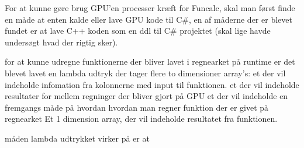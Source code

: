 For at kunne gøre brug GPU'en processer kræft for Funcalc, skal man først finde en måde at enten kalde eller lave GPU kode til C#, en af måderne der er blevet fundet er at lave C++ koden som en ddl til C# projektet (skal lige havde undersøgt hvad der rigtig sker).





for at kunne udregne funktionerne der bliver lavet i regnearket på runtime er det blevet lavet en lambda udtryk der tager
flere to dimensioner array's:
et der vil indeholde infomation fra kolonnerne med input til funktionen.
et der vil indeholde resultater for mellem regninger der bliver gjort på GPU
et der vil indeholde en fremgangs måde på hvordan hvordan man regner funktion der er givet på regnearket 
Et 1 dimension array, der vil indeholde resultatet fra funktionen.

måden lambda udtrykket virker på er at 


